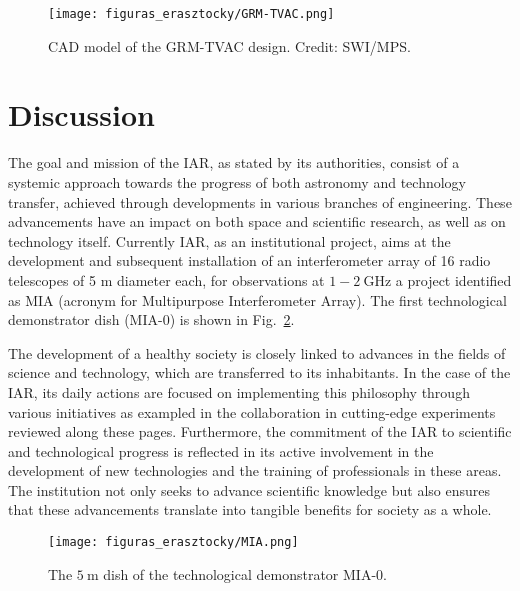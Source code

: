 \documentclass[baaa]{baaa}
\begin{document}
\begin{figure}[!t]
\centering
\texttt{[image: figuras\_erasztocky/GRM-TVAC.png]}
\caption{CAD model of the GRM-TVAC design. Credit: SWI/MPS.}
\label{GRM-TVAC}
\end{figure}


\section{Discussion}\label{sec:Discussion}

The goal and mission of the IAR, as stated by its authorities, consist of a systemic approach towards the progress of both astronomy and technology transfer, achieved through developments in various branches of engineering. These advancements have an impact on both space and scientific research, as well as on technology itself.
Currently IAR, as an institutional project, aims at the development and subsequent installation of an interferometer array of 16 radio telescopes of 5 m diameter each, for observations at $1-2~\mathrm{GHz}$ a project identified as MIA\citep{romero2023multipurpose} (acronym for Multipurpose Interferometer Array). The first technological demonstrator dish (MIA-0) is shown in Fig.~\ref{MIA}.

The development of a healthy society is closely linked to advances in the fields of science and technology, which are transferred to its inhabitants. In the case of the IAR, its daily actions are focused on implementing this philosophy through various initiatives as exampled in the collaboration in cutting-edge experiments reviewed along these pages.
Furthermore, the commitment of the IAR to scientific and technological progress is reflected in its active involvement in the development of new technologies and the training of professionals in these areas. The institution not only seeks to advance scientific knowledge but also ensures that these advancements translate into tangible benefits for society as a whole.

\begin{figure}[!t]
\centering
\texttt{[image: figuras\_erasztocky/MIA.png]}
\caption{The $5~\mathrm{m}$ dish of the technological demonstrator MIA-0.}
\label{MIA}
\end{figure}

\end{document}
